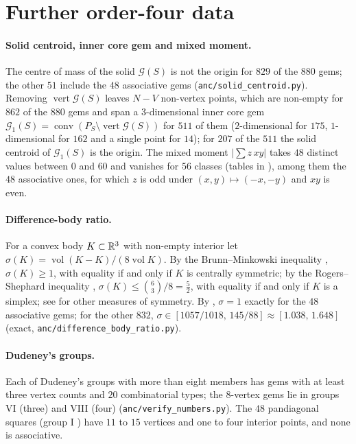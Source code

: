 \section{Further order-four data}
\label{sec:further4}

\paragraph{Solid centroid, inner core gem and mixed moment.}
The centre of mass of the solid $\mathcal G(S)$ is not the origin for $829$ of the $880$ gems; the other $51$ include the $48$ associative gems (\texttt{anc/solid\_centroid.py}).
Removing $\operatorname{vert}\mathcal G(S)$ leaves $N-V$ non-vertex points, which are non-empty for $862$ of the $880$ gems and span a $3$-dimensional inner core gem $\mathcal G_1(S)=\operatorname{conv}(P_S\setminus\operatorname{vert}\mathcal G(S))$ for $511$ of them ($2$-dimensional for $175$, $1$-dimensional for $162$ and a single point for $14$); for $207$ of the $511$ the solid centroid of $\mathcal G_1(S)$ is the origin.
The mixed moment $|\sum z\,xy|$ takes $48$ distinct values between $0$ and $60$ and vanishes for $56$ classes (tables in ), among them the $48$ associative ones, for which $z$ is odd under $(x,y)\mapsto(-x,-y)$ and $xy$ is even.

\paragraph{Difference-body ratio.}
For a convex body $K\subset\mathbb{R}^3$ with non-empty interior let $\sigma(K)=\operatorname{vol}(K-K)/(8\operatorname{vol}K)$. By the Brunn--Minkowski inequality \cite{schneider2014convex}, $\sigma(K)\ge1$, with equality if and only if $K$ is centrally symmetric; by the Rogers--Shephard inequality \cite{rogers1957difference}, $\sigma(K)\le\binom63/8=\frac52$, with equality if and only if $K$ is a simplex; see \cite{grunbaum1963measures,schneider2014convex} for other measures of symmetry.
By , $\sigma=1$ exactly for the $48$ associative gems; for the other $832$, $\sigma\in[1057/1018,\,145/88]\approx[1.038,\,1.648]$ (exact, \texttt{anc/difference\_body\_ratio.py}).

\paragraph{Dudeney's groups.}
Each of Dudeney's groups with more than eight members has gems with at least three vertex counts and $20$ combinatorial types; the $8$-vertex gems lie in groups VI (three) and VIII (four) (\texttt{anc/verify\_numbers.py}).
The $48$ pandiagonal squares (group I \cite{ollerenshaw1998most}) have $11$ to $15$ vertices and one to four interior points, and none is associative.

